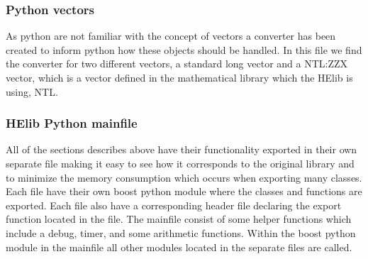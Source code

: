 \newpage

\subsubsection{Python vectors}
As python are not familiar with the concept of vectors a converter has been created to inform python how these objects should be handled. In this file we find the converter for two different vectors, a standard long vector and a NTL:ZZX vector, which is a vector defined in the mathematical library which the HElib is using, NTL.

\subsubsection{HElib Python mainfile}
All of the sections describes above have their functionality exported in their own separate file making it easy to see how it corresponds to the original library and to minimize the memory consumption which occurs when exporting many classes. Each file have their own boost python module where the classes and functions are exported. Each file also have a corresponding header file declaring the export function located in the file. The mainfile consist of some helper functions which include a debug, timer, and some arithmetic functions. Within the boost python module in the mainfile all other modules located in the separate files are called.
